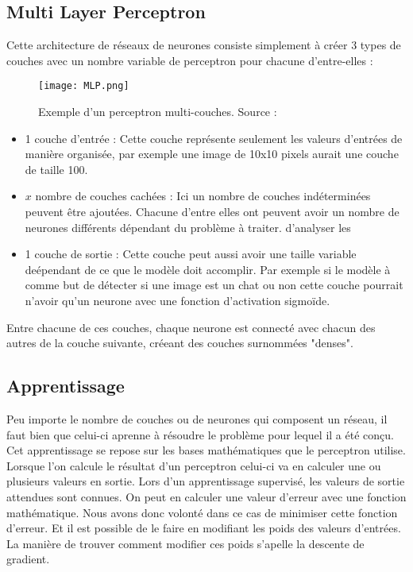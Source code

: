 \subsection{Multi Layer Perceptron}

Cette architecture de réseaux de neurones consiste simplement à créer 3 types de couches avec un nombre variable de perceptron pour chacune d'entre-elles :

\begin{figure}[tbph!]
	\centering
	\texttt{[image: MLP.png]}
	\caption[Exemple d'un perceptron multi-couches]{Exemple d'un perceptron multi-couches. Source : \cite{MLPImage}}
\end{figure}

\begin{itemize}
	\item 1 couche d'entrée : Cette couche représente seulement les valeurs d'entrées de manière organisée, 
	par exemple une image de 10x10 pixels aurait une couche de taille 100. 
	\item $x$ nombre de couches cachées : Ici un nombre de couches indéterminées peuvent être ajoutées. 
	Chacune d'entre elles ont peuvent avoir un nombre de neurones différents dépendant du problème à traiter. d'analyser les 
	\item 1 couche de sortie : Cette couche peut aussi avoir une taille variable deépendant de ce que le modèle doit accomplir. 
	Par exemple si le modèle à comme but de détecter si une image est un chat ou non cette couche pourrait n'avoir qu'un neurone avec une fonction d'activation sigmoïde.
\end{itemize}

Entre chacune de ces couches, chaque neurone est connecté avec chacun des autres de la couche suivante, créeant des couches surnommées "denses".

\subsection{Apprentissage}

Peu importe le nombre de couches ou de neurones qui composent un réseau, il faut bien que celui-ci aprenne à résoudre le problème pour lequel il a été conçu.
Cet apprentissage se repose sur les bases mathématiques que le perceptron utilise. 
Lorsque l'on calcule le résultat d'un perceptron celui-ci va en calculer une ou plusieurs valeurs en sortie.
Lors d'un apprentissage supervisé, les valeurs de sortie attendues sont connues. On peut en calculer une valeur d'erreur avec une fonction mathématique.
Nous avons donc volonté dans ce cas de minimiser cette fonction d'erreur. Et il est possible de le faire en modifiant les poids des valeurs d'entrées. 
La manière de trouver comment modifier ces poids s'apelle la descente de gradient.

